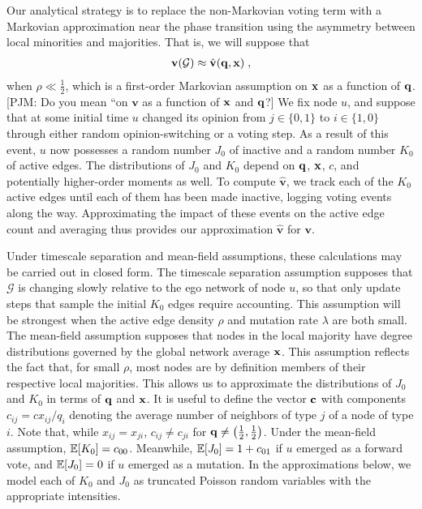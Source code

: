 \documentclass[review, onefignum, onetabnum]{siamart171218}
\newcommand{\pjm}[1]{{\color{blue}[PJM: #1]}}
\begin{document}
		Our analytical strategy is to replace the non-Markovian voting term with a Markovian approximation near the phase transition using the asymmetry between local minorities and majorities. 
		That is, we will suppose that 
		\begin{align}
			\mathbf{v}(\mathcal{G}) \approx \hat{\mathbf{v}}(\q, \x)\;, \label{eq:markov}
		\end{align}
		when $\rho \ll \frac{1}{2}$, which is a first-order Markovian assumption on $\mathbf{x}$ as a function of $\mathbf{q}$. \pjm{Do you mean ``on $\mathbf{v}$ as a function of $\mathbf{x}$ and $\mathbf{q}$?}
		We fix node $u$, and suppose that at some initial time $u$ changed its opinion from $j \in \{0,1\}$ to $i \in \{1,0\}$ through either random opinion-switching or a voting step. 
		As a result of this event, $u$ now possesses a  random number $J_0$ of inactive and a random number $K_0$ of active edges. 
		The distributions of $J_0$ and $K_0$ depend on $\mathbf{q}$, $\mathbf{x}$, $c$, and potentially higher-order moments as well. 
		To compute $\hat{\mathbf{v}}$, we track each of the $K_0$ active edges until each of them has been made inactive, logging voting events along the way.
		Approximating the impact of these events on the active edge count and averaging thus provides our approximation $\hat{\mathbf{v}}$ for $\mathbf{v}$.
		
		Under timescale separation and mean-field   assumptions, these calculations may be carried out in closed form. 
		The timescale separation assumption supposes that $\mathcal{G}$ is changing slowly relative to the ego network of node $u$, so that only update steps that sample the initial $K_0$ edges require accounting. 
		This assumption will be strongest when the active edge density $\rho$ and mutation rate $\lambda$ are both small. 
		The mean-field assumption supposes that nodes in the local majority have degree distributions governed by the global network average $\mathbf{x}$. 
		This assumption reflects the fact that, for small $\rho$, most nodes are by definition members of their respective local majorities. 
		This allows us to approximate the distributions of $J_0$ and $K_0$ in terms of $\mathbf{q}$ and $\mathbf{x}$. 
		It is useful to define the vector $\mathbf{c}$ with components $c_{ij} = c{x_{ij}}/{q_i}$ denoting the average number of neighbors of type $j$ of a node of type $i$. 
		Note that, while $x_{ij} = x_{ji}$, $c_{ij} \neq c_{ji}$ for $\mathbf{q} \neq \left(\frac{1}{2}, \frac{1}{2}\right)$.
		Under the mean-field assumption, $\mathbb{E}[K_0] = c_{00}$. 
		Meanwhile, $\mathbb{E}[J_0] = 1 + c_{01}$ if $u$ emerged as a forward vote, and $\mathbb{E}[J_0] = 0$ if $u$ emerged as a mutation. 
		In the approximations below, we model each of $K_0$ and $J_0$ as truncated Poisson random variables with the appropriate intensities. 
\end{document}
